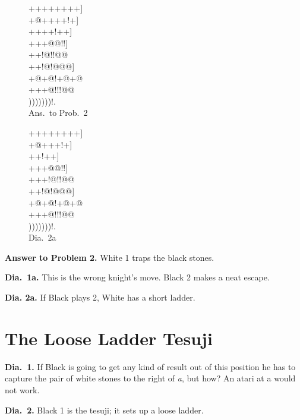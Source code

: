\documentclass[mcrownvopaper,10pt,twopage,onecolumn,final]{memoir}
\begin{document}
\begin{figure}[!ht]
    \begin{minipage}[c]{0.5\linewidth}
        \centering    
        {\gnos%
        ++++++++]\\
        +@++++!+]\\
        ++{\gnosw{}}++!++]\\
        +++{\gnosb{}}@@!!]\\
        ++{\gnosw{}}!@!!@@\\
        ++!@!@@@]\\
        +@+@!+@+@\\
        +++@!!!@@\\
        )))))))!.\\
        }
        Ans.\ to Prob.\ 2
    \end{minipage}%
    \begin{minipage}[c]{0.5\linewidth}
        \centering    
        {\gnos%
        ++++++++]\\
        +@+{\gnosw{}}++!+]\\
        ++{\gnosw{}}{\gnosb{}}{\gnosb{}}!++]\\
        +++{\gnosw{}}@@!!]\\
        +++!@!!@@\\
        ++!@!@@@]\\
        +@+@!+@+@\\
        +++@!!!@@\\
        )))))))!.\\
        }
        Dia.\ 2a
    \end{minipage}%
\end{figure}

\noindent
\textbf{Answer to Problem 2.} White 1 traps the black stones.

\noindent
\textbf{Dia.\ 1a.} This is the wrong knight's move. Black 2 makes a neat escape.

\noindent
\textbf{Dia. 2a.} If Black plays 2, White has a short ladder.

\section{The Loose Ladder Tesuji}
\noindent
\textbf{Dia.\ 1.} If Black is going to get any kind of result out of this position he
has to capture the pair of white stones to the right of \textit{a}, but how? An
atari at a would not work.

\noindent
\textbf{Dia.\ 2.} Black 1 is the tesuji; it sets up a loose ladder.
\end{document}

